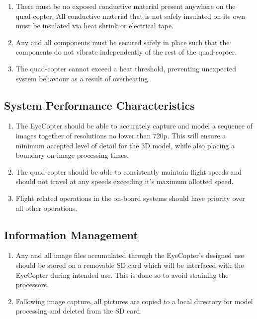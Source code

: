 \documentclass[10pt,letterpaper]{article}
\begin{document}
\begin{enumerate}[label=\textbf{PH\arabic*}]
\item There must be no exposed conductive material present anywhere on the quad-copter. All conductive material that is not safely insulated on its own must be insulated via heat shrink or electrical tape.

\item Any and all components must be secured safely in place such that the components do not vibrate independently of the rest of the quad-copter. 

\item The quad-copter cannot exceed a heat threshold, preventing unexpected system behaviour as a result of overheating.

\end{enumerate}

\subsection{System Performance Characteristics}
\begin{enumerate}[label=\textbf{SC\arabic*}]
	\item The EyeCopter should be able to accurately capture and model a sequence of images together of resolutions no lower than 720p. This will ensure a minimum accepted level of detail for the 3D model, while also placing a boundary on image processing times.
    \item The quad-copter should be able to consistently maintain flight speeds and should not travel at any speeds exceeding it's maximum allotted speed.
	\item Flight related operations in the on-board systems should have priority over all other operations.
\end{enumerate}

\subsection{Information Management}
\begin{enumerate}[label=\textbf{IM\arabic*}]
	\item Any and all image files accumulated through the EyeCopter's designed use should be stored on a removable SD card which will be interfaced with the EyeCopter during intended use. This is done so to avoid straining the processors.
    \item Following image capture, all pictures are copied to a local directory for model processing and deleted from the SD card.
\end{enumerate}
\end{document}
